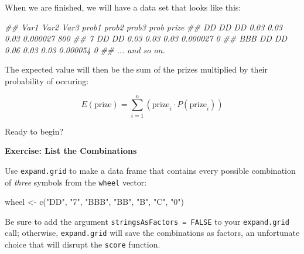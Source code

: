 \documentclass[
  letterpaper,
  DIV=11,
  numbers=noendperiod]{scrbook}
\newenvironment{Shaded}{\begin{snugshade}}{\end{snugshade}}
\newcommand{\DocumentationTok}[1]{\textcolor[rgb]{0.37,0.37,0.37}{\textit{#1}}}
\newcommand{\FunctionTok}[1]{\textcolor[rgb]{0.28,0.35,0.67}{#1}}
\newcommand{\NormalTok}[1]{\textcolor[rgb]{0.00,0.23,0.31}{#1}}
\newcommand{\OtherTok}[1]{\textcolor[rgb]{0.00,0.23,0.31}{#1}}
\newcommand{\StringTok}[1]{\textcolor[rgb]{0.13,0.47,0.30}{#1}}
\begin{document}
When we are finished, we will have a data set that looks like this:

\begin{Shaded}
\begin{Highlighting}[]
\DocumentationTok{\#\# Var1 Var2 Var3 prob1 prob2 prob3     prob prize}
\DocumentationTok{\#\#   DD   DD   DD  0.03  0.03  0.03 0.000027   800}
\DocumentationTok{\#\#    7   DD   DD  0.03  0.03  0.03 0.000027     0}
\DocumentationTok{\#\#  BBB   DD   DD  0.06  0.03  0.03 0.000054     0}
\DocumentationTok{\#\# ... and so on.}
\end{Highlighting}
\end{Shaded}

The expected value will then be the sum of the prizes multiplied by
their probability of occuring:

\[
E(\text{prize}) = \sum_{i = 1}^{n}\left( \text{prize}_{i} \cdot P(\text{prize}_{i}) \right)
\]

Ready to begin?

\begin{tcolorbox}[enhanced jigsaw, left=2mm, breakable, colback=white, colframe=quarto-callout-color-frame, leftrule=.75mm, bottomrule=.15mm, arc=.35mm, opacityback=0, rightrule=.15mm, toprule=.15mm]

\vspace{-3mm}\textbf{Exercise: List the Combinations}\vspace{3mm}

Use \texttt{expand.grid} to make a data frame that contains every
possible combination of \emph{three} symbols from the \texttt{wheel}
vector:

\begin{Shaded}
\begin{Highlighting}[]
\NormalTok{wheel }\OtherTok{\textless{}{-}} \FunctionTok{c}\NormalTok{(}\StringTok{"DD"}\NormalTok{, }\StringTok{"7"}\NormalTok{, }\StringTok{"BBB"}\NormalTok{, }\StringTok{"BB"}\NormalTok{, }\StringTok{"B"}\NormalTok{, }\StringTok{"C"}\NormalTok{, }\StringTok{"0"}\NormalTok{)}
\end{Highlighting}
\end{Shaded}

Be sure to add the argument \texttt{stringsAsFactors\ =\ FALSE} to your
\texttt{expand.grid} call; otherwise, \texttt{expand.grid} will save the
combinations as factors, an unfortunate choice that will disrupt the
\texttt{score} function.

\end{tcolorbox}
\end{document}
